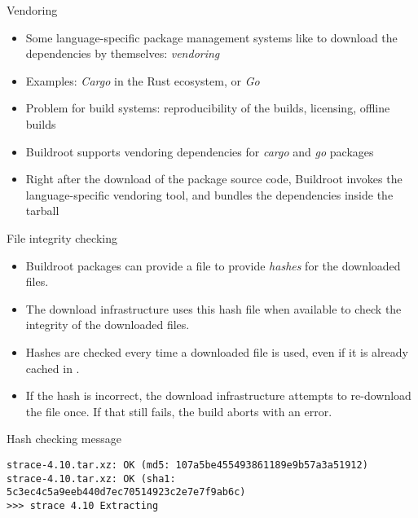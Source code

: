 \begin{frame}{Vendoring}
  \begin{itemize}
  \item Some language-specific package management systems like to
    download the dependencies by themselves: {\em vendoring}
  \item Examples: {\em Cargo} in the Rust ecosystem, or {\em Go}
  \item Problem for build systems: reproducibility of the builds,
    licensing, offline builds
  \item Buildroot supports vendoring dependencies for {\em cargo} and
    {\em go} packages
  \item Right after the download of the package source code, Buildroot
    invokes the language-specific vendoring tool, and bundles the
    dependencies inside the tarball
  \end{itemize}
\end{frame}

\begin{frame}[fragile]{File integrity checking}
  \begin{itemize}
  \item Buildroot packages can provide a  file to provide
    {\em hashes} for the downloaded files.
  \item The download infrastructure uses this hash file when available
    to check the integrity of the downloaded files.
  \item Hashes are checked every time a downloaded file is used, even
    if it is already cached in .
  \item If the hash is incorrect, the download infrastructure attempts
    to re-download the file once. If that still fails, the build
    aborts with an error.
  \end{itemize}

  \begin{block}{Hash checking message}
{\scriptsize
\begin{verbatim}
strace-4.10.tar.xz: OK (md5: 107a5be455493861189e9b57a3a51912)
strace-4.10.tar.xz: OK (sha1: 5c3ec4c5a9eeb440d7ec70514923c2e7e7f9ab6c)
>>> strace 4.10 Extracting
\end{verbatim}}
  \end{block}
\end{frame}

